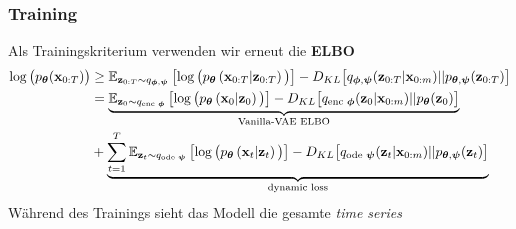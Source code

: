 \begin{frame}
    \frametitle{Training}
    Als Trainingskriterium verwenden wir erneut die \textbf{ELBO} 	
    	{\footnotesize\begin{align*}
            \log\big(p_{\boldsymbol{\theta}}(\mathbf{x}_{0:T})\big)&\ge \mathbb{E}_{\mathbf{z}_{0:T}\sim q_{\boldsymbol\phi,\boldsymbol\psi}}
            \left[\log\big(p_{\boldsymbol\theta}\left(\mathbf{x}_{0:T}|\mathbf{z}_{0:T}\right)\big)\right] - D_{KL}\big[q_{\boldsymbol\phi,\boldsymbol\psi}(\mathbf{z}_{0:T}|\mathbf{x}_{0:m})||p_{\boldsymbol\theta,\boldsymbol\psi}(\mathbf{z}_{0:T})\big]\\
            &=\underbrace{\mathbb{E}_{\mathbf{z}_{0}\sim q_{\text{enc }\boldsymbol\phi}}
    	    \left[\log\big(p_{\boldsymbol\theta}\left(\mathbf{x}_{0}|\mathbf{z}_{0}\right)\big)\right] - D_{KL}\big[q_{\text{enc }\boldsymbol\phi}(\mathbf{z}_{0}|\mathbf{x}_{0:m})||p_{\boldsymbol\theta}(\mathbf{z}_{0})\big]}_{\text{Vanilla-VAE ELBO}}\\ &+ \underbrace{\sum_{t=1}^T \mathbb{E}_{\mathbf{z}_{t}\sim q_{\text{ode }\boldsymbol\psi}}
    	    \left[\log\big(p_{\boldsymbol\theta}\left(\mathbf{x}_{t}|\mathbf{z}_{t}\right)\big)\right] - D_{KL}\big[q_{\text{ode }\boldsymbol\psi}(\mathbf{z}_{t}|\mathbf{x}_{0:m})||p_{\boldsymbol\theta,\boldsymbol\psi}(\mathbf{z}_{t})\big]}_{\text{dynamic loss}}
    \end{align*}}
    Während des Trainings sieht das Modell die gesamte \emph{time series}
\end{frame}






